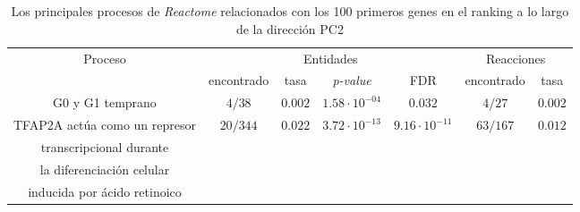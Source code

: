 
\chapter{}\label{apx:apx6}

\begin{table}[!htb]
	\centering
	\caption{Los principales procesos de \textit{Reactome} relacionados con los 100 primeros genes en el ranking a lo largo de la dirección PC2}
	\label{tab:apx6}
	\begin{tabular}{|c|c|c|c|c|c|c|}
		\hline
		\multirow{2}{*}{Proceso} & \multicolumn{4}{c|}{Entidades} & \multicolumn{2}{c|}{Reacciones} \\ \cline{2-7}
		& encontrado & tasa & \textit{p-value} & FDR & encontrado & tasa \\ \hline
		
		G0 y G1 temprano & $4/38$ & $0.002$ & $1.58 \cdot 10 ^{-04}$ & $0.032$ & $4/27$ & $0.002$ \\ \hline
		
		TFAP2A actúa como un represor & \multirow{4}{*}{$20/344$} & \multirow{4}{*}{$0.022$} & \multirow{4}{*}{$3.72 \cdot 10^{-13}$} & \multirow{4}{*}{$9.16 \cdot 10^{-11}$} & \multirow{4}{*}{$63/167$} & \multirow{4}{*}{$0.012$} \\
		transcripcional durante & & & & & & \\
		la diferenciación celular & & & & & & \\
		inducida por ácido retinoico  & & & & & & \\\hline
		
		
		
		
	\end{tabular}
\end{table}



